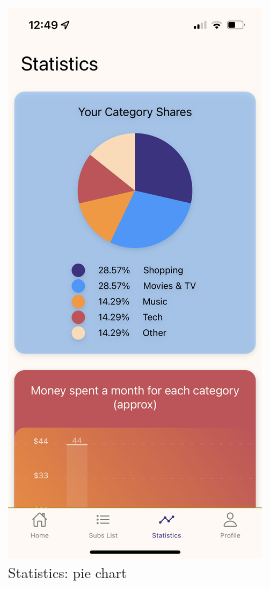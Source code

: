 \documentclass[12pt]{article}
\begin{document}
\begin{figure}[h!]
\begin{minipage}[c]{0.45\textwidth}
        \includegraphics[width=0.6\textwidth, clip]{../../assets/smartphone/stat.PNG}
        \caption{Statistics: pie chart}
        \label{fig:stat}
    \end{minipage}
\end{figure}
\end{document}
